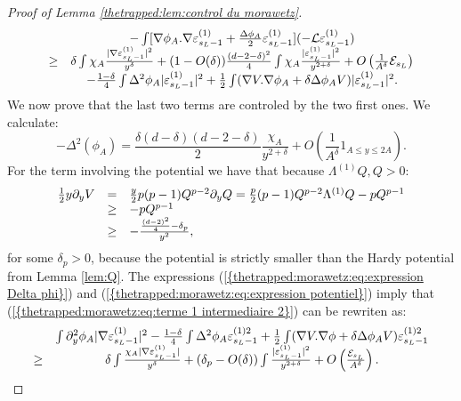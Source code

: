 \documentclass[11pt,a4paper,reqno]{amsart}
\theoremstyle{remark}
\numberwithin{equation}{section}
\begin{document}
\begin{proof}[Proof of Lemma \ref{thetrapped:lem:control du morawetz}]
\begin{equation}
\begin{array}{r c l}
&-\int [\nabla \phi_A .\nabla \varepsilon^{(1)}_{s_L-1}+\frac{\Delta \phi_A}{2}\varepsilon^{(1)}_{s_L-1}] (-\mathcal{L}\varepsilon^{(1)}_{s_L-1})\\
\geq&   \delta \int \chi_A \frac{|\nabla \varepsilon^{(1)}_{s_L-1}|^2}{y^{\delta}}+(1-O(\delta))\frac{(d-2-\delta)^2}{4} \int \chi_A \frac{|\varepsilon^{(1)}_{s_L-1}|^2}{y^{2+\delta}} +O\left( \frac{1}{A^{\delta}}\mathcal{E}_{s_L} \right)     \\
&-\frac{1-\delta}{4}\int \Delta^2 \phi_A |\varepsilon^{(1)}_{s_L-1}|^2+\frac{1}{2} \int (\nabla V.\nabla \phi_A+\delta\Delta \phi_A V) |\varepsilon^{(1)}_{s_L-1}|^2.
\end{array}
\end{equation}
We now prove that the last two terms are controled by the two first ones. We calculate:
\begin{equation}  \label{thetrapped:morawetz:eq:expression Delta phi}
-\Delta^2 (\phi_A)= \frac{\delta(d-\delta)(d-2-\delta)}{2}\frac{\chi_A}{y^{2+\delta}} +O\left( \frac{1}{A^{\delta}}1_{A\leq y\leq 2A} \right) .
\end{equation}
For the term involving the potential we have that because $\Lambda^{(1)}Q,Q>0$:
\begin{equation} \label{thetrapped:morawetz:eq:expression potentiel}
\begin{array}{r c l}
\frac{1}{2}y\partial_y V&=&\frac{y}{2}p(p-1)Q^{p-2}\partial_y Q=\frac{p}{2}(p-1)Q^{p-2}\Lambda^{(1)}Q -pQ^{p-1} \\
&\geq & -pQ^{p-1} \\
&\geq & -\frac{\frac{(d-2)^2}{4}-\delta_p}{y^2} ,
\end{array}
\end{equation}
for some $\delta_p>0$, because the potential is strictly smaller than the Hardy potential from Lemma \ref{lem:Q}. The expressions {{\rm (\ref{{thetrapped:morawetz:eq:expression Delta phi}})}} and {{\rm (\ref{{thetrapped:morawetz:eq:expression potentiel}})}} imply that {{\rm (\ref{{thetrapped:morawetz:eq:terme 1 intermediaire 2}})}} can be rewriten as:
$$
\begin{array}{r c l}
&\int \partial_y^2 \phi_A |\nabla \varepsilon^{(1)}_{s_L-1}|^2-\frac{1-\delta}{4}\int \Delta^2 \phi_A \varepsilon^{(1)2}_{s_L-1}+\frac{1}{2} \int (\nabla V.\nabla \phi+\delta \Delta \phi_A V) \varepsilon^{(1)2}_{s_L-1} \\
\geq& \delta \int \frac{\chi_A|\nabla \varepsilon^{(1)}_{s_L-1}|}{y^{\delta}}+ (\delta_p - O(\delta))\int \frac{|\varepsilon^{(1)}_{s_L-1}|^2}{y^{2+\delta}}+O\left( \frac{\mathcal{E}_{s_L}}{A^{\delta}}\right) .

\end{array}$$
\end{proof}
\end{document}
